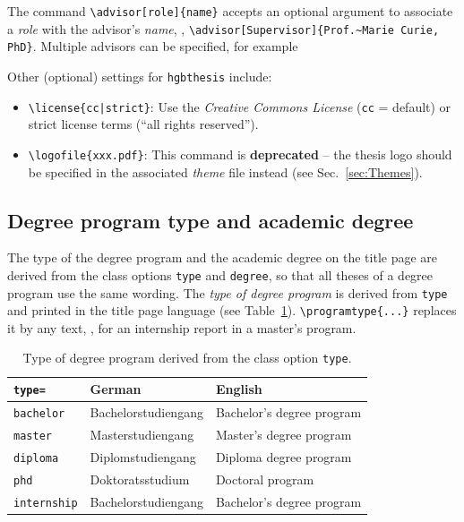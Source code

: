 \documentclass[language=english]{hgbarticle}
\begin{document}
The command \verb!\advisor[role]{name}! accepts an optional argument to associate a \emph{role} 
with the advisor's \emph{name}, \eg, \verb!\advisor[Supervisor]{Prof.~Marie Curie, PhD}!.
Multiple advisors can be specified, for example
%
\begin{LaTeXCode}[numbers=none]
\end{LaTeXCode}

\noindent
Other (optional) settings for \texttt{hgbthesis} include:
\begin{itemize}
    \item \verb!\license{cc|strict}!:
    Use the \emph{Creative Commons License} (\texttt{cc} = default) or strict license terms
      (``all rights reserved'').
    \item \verb!\logofile{xxx.pdf}!:
		This command is \textbf{deprecated} -- the thesis logo 
		should be specified in the associated \emph{theme} file instead (see Sec.~\ref{sec:Themes}).
\end{itemize}

\subsection{Degree program type and academic degree}
\label{sec:AcademicDegrees}

The type of the degree program and the academic degree on the title page are derived from the
class options \texttt{type} and \texttt{degree}, so that all theses of a degree program use the
same wording.
The \emph{type of degree program} is derived from \texttt{type} and printed in the title page
language (see Table~\ref{tab:ProgramTypes}). \verb!\programtype{...}! replaces it by any
text, \eg, for an internship report in a master's program.

\begin{table}[H]
\caption{Type of degree program derived from the class option \texttt{type}.}
\label{tab:ProgramTypes}
\centering\small
\begin{tabular}{@{}lll@{}}
	\toprule
	\texttt{type=} & German & English \\
	\midrule
	\texttt{bachelor}   & Bachelorstudiengang & Bachelor's degree program \\
	\texttt{master}     & Masterstudiengang   & Master's degree program \\
	\texttt{diploma}    & Diplomstudiengang   & Diploma degree program \\
	\texttt{phd}        & Doktoratsstudium    & Doctoral program \\
	\texttt{internship} & Bachelorstudiengang & Bachelor's degree program \\
	\bottomrule
\end{tabular}
\end{table}
\end{document}
